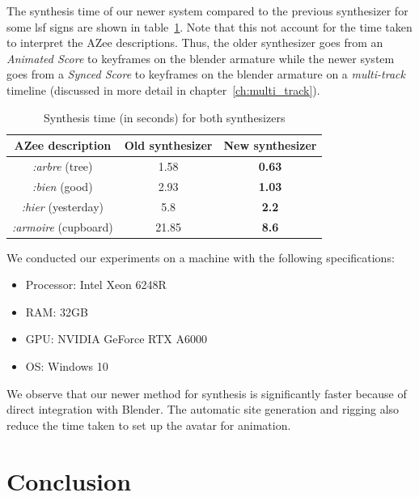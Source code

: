 \documentclass[../../main.tex]{subfiles}
\begin{document}
The synthesis time of our newer system compared to the previous synthesizer for some \gls{lsf} signs are shown in table~\ref{tab:faster_executions}. Note that this not account for the time taken to interpret the AZee descriptions. Thus, the older synthesizer goes from an \emph{Animated Score} to keyframes on the blender armature while the newer system goes from a \emph{Synced Score} to keyframes on the blender armature on a \emph{multi-track} timeline (discussed in more detail in chapter~\ref{ch:multi_track}).

\begin{table}
    \centering
    \begin{tabular}{|c|c|c|}
        \hline
        \textbf{AZee description} & \textbf{Old synthesizer} & \textbf{New synthesizer}\\
        \hline
        \emph{:arbre} (tree) & 1.58 & \textbf{0.63} \\
        \emph{:bien} (good) & 2.93 & \textbf{1.03} \\
        \emph{:hier} (yesterday) & 5.8 & \textbf{2.2} \\
        \emph{:armoire} (cupboard) & 21.85 & \textbf{8.6} \\
        \hline
    \end{tabular}
    \caption{Synthesis time (in seconds) for both synthesizers}
    \label{tab:faster_executions}
\end{table}

We conducted our experiments on a machine with the following specifications:
\begin{itemize}
    \item Processor: Intel Xeon 6248R
    \item RAM: 32GB
    \item GPU: NVIDIA GeForce RTX A6000
    \item OS: Windows 10
\end{itemize}

We observe that our newer method for synthesis is significantly faster because of direct integration with Blender. The automatic site generation and rigging also reduce the time taken to set up the avatar for animation.

\section{Conclusion}
\label{ch:avatar_creation_pose_synthesis:conclusion}
\end{document}
